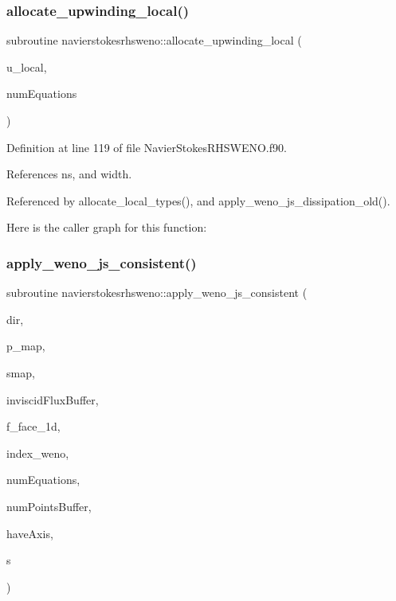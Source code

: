 \subsubsection{\texorpdfstring{allocate\+\_\+upwinding\+\_\+local()}{allocate\_upwinding\_local()}}
{\footnotesize\ttfamily subroutine navierstokesrhsweno\+::allocate\+\_\+upwinding\+\_\+local (\begin{DoxyParamCaption}\item[{type(\hyperlink{structnavierstokesrhsweno_1_1upwinding__local}{upwinding\+\_\+local})}]{u\+\_\+local,  }\item[{integer, intent(in)}]{num\+Equations }\end{DoxyParamCaption})}



Definition at line 119 of file Navier\+Stokes\+R\+H\+S\+W\+E\+N\+O.\+f90.



References ns, and width.



Referenced by allocate\+\_\+local\+\_\+types(), and apply\+\_\+weno\+\_\+js\+\_\+dissipation\+\_\+old().

Here is the caller graph for this function\+:
\hypertarget{namespacenavierstokesrhsweno_a095da8b7b85aaaf8e6f6d77d12520819}{}\label{namespacenavierstokesrhsweno_a095da8b7b85aaaf8e6f6d77d12520819} 
\subsubsection{\texorpdfstring{apply\+\_\+weno\+\_\+js\+\_\+consistent()}{apply\_weno\_js\_consistent()}}
{\footnotesize\ttfamily subroutine navierstokesrhsweno\+::apply\+\_\+weno\+\_\+js\+\_\+consistent (\begin{DoxyParamCaption}\item[{integer(kind=4)}]{dir,  }\item[{integer(kind=8), dimension(\+:)}]{p\+\_\+map,  }\item[{real(kind=8), dimension(\+:,\+:)}]{smap,  }\item[{real(kind=8), dimension(numequations$\ast$numpointsbuffer)}]{inviscid\+Flux\+Buffer,  }\item[{real(kind=8), dimension(\+:,\+:)}]{f\+\_\+face\+\_\+1d,  }\item[{integer(kind=8), dimension(2)}]{index\+\_\+weno,  }\item[{integer(kind=4)}]{num\+Equations,  }\item[{integer(kind=8)}]{num\+Points\+Buffer,  }\item[{integer(kind=4)}]{have\+Axis,  }\item[{integer, dimension(numequations)}]{s }\end{DoxyParamCaption})}



